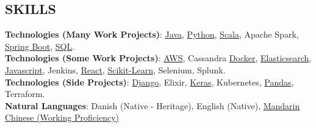 \documentclass[margin]{res}
\begin{document}
\begin{resume}




\section{SKILLS}

\textbf{Technologies (Many Work Projects)}:
\href{https://www.lucaskjaerozhang.com/technology/java/}{Java},
\href{https://www.lucaskjaerozhang.com/technology/python/}{Python},
\href{https://www.lucaskjaerozhang.com/technology/scala/}{Scala},
Apache Spark,
\href{https://www.lucaskjaerozhang.com/technology/spring-boot/}{Spring Boot},
\href{https://www.lucaskjaerozhang.com/technology/sql/}{SQL}.
\\
\textbf{Technologies (Some Work Projects)}:
\href{https://www.lucaskjaerozhang.com/technology/aws/}{AWS},
Cassandra
\href{https://www.lucaskjaerozhang.com/technology/docker/}{Docker},
\href{https://www.lucaskjaerozhang.com/technology/elasticsearch/}{Elasticsearch},
\href{https://www.lucaskjaerozhang.com/technology/javascript/}{Javascript},
Jenkins,
\href{https://www.lucaskjaerozhang.com/technology/react/}{React},
\href{https://www.lucaskjaerozhang.com/technology/sklearn/}{Scikit-Learn},
Selenium,
Splunk.
\\
\textbf{Technologies (Side Projects)}:
\href{https://www.lucaskjaerozhang.com/technology/django/}{Django},
Elixir,
\href{https://www.lucaskjaerozhang.com/technology/keras/}{Keras},
Kubernetes,
\href{https://www.lucaskjaerozhang.com/technology/pandas/}{Pandas},
Terraform.
\\
\textbf{Natural Languages}: Danish (Native - Heritage), English (Native), \href{https://www.lucaskjaerozhang.com/lucas-kjaero-zhang-%E4%B8%AA%E4%BA%BA%E7%AE%80%E5%8E%86.pdf}{Mandarin Chinese (Working Proficiency)}


\end{resume}
\end{document}

